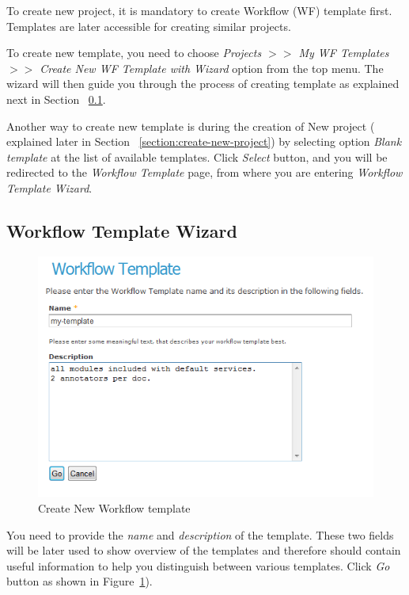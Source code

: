 To create new project, it is mandatory to create Workflow (WF) template first.
Templates are later accessible for creating similar projects.

To create new template, you need to choose \emph{Projects $>>$
My WF Templates $>>$ Create New WF Template with Wizard} option from the top
menu. The wizard will then
guide you through the process of creating template as explained next in Section
~\ref{section:workflow-template-wizard}.

Another way to create new template is during the creation of New project (
explained later in Section
~\ref{section:create-new-project}) by selecting option
\emph{Blank template} at the list of available templates. Click \emph{Select}
button, and you will be redirected to the \emph {Workflow Template} page, from
where you are entering \emph {Workflow Template Wizard}.

\subsection{Workflow Template Wizard}
\label{section:workflow-template-wizard}
\begin{figure}[hb!]
\centering
\includegraphics[scale=0.4]{createwftemplate}
\caption{Create New Workflow template}
\label{fig:createwftemplate}
\end{figure}
You need to provide the \emph{name} and \emph{description} of the template.
These two fields will be later used to show overview of the templates and therefore should
contain useful information to help you distinguish between various templates.
Click \emph{Go} button as shown in Figure~\ref{fig:createwftemplate}).


